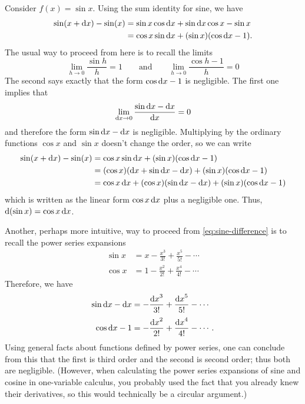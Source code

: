 \documentclass[12pt]{amsart}
\begin{document}
\begin{eg}
  Consider $f(x) = \sin x$.
  Using the sum identity for sine, we have
  \begin{align}
    \sin(x+{\mathrm{d} x}) - \sin (x)
    &= \sin x \cos {\ensuremath{\mathrm{d} x}} + \sin {\ensuremath{\mathrm{d} x}} \cos x - \sin x \notag\\
    &= \cos x \sin {\ensuremath{\mathrm{d} x}} + (\sin x) (\cos {\ensuremath{\mathrm{d} x}} - 1).\label{eq:sine-difference}
  \end{align}
  The usual way to proceed from here is to recall the limits
  \[ \lim_{h\to 0} \frac{\sin h}{h} = 1 \qquad\text{and}\qquad
  \lim_{h\to 0} \frac{\cos h - 1}{h} = 0 \]
  The second says exactly that the form $\cos {\ensuremath{\mathrm{d} x}} - 1$ is negligible.
  The first one implies that
  \[ \lim_{{\mathrm{d} x}\to 0} \frac{\sin {\ensuremath{\mathrm{d} x}} - {\mathrm{d} x}}{{\mathrm{d} x}} = 0 \]
  and therefore the form $\sin {\ensuremath{\mathrm{d} x}} - {\mathrm{d} x}$ is negligible.
  Multiplying by the ordinary functions $\cos x$ and $\sin x$ doesn't change the order, so we can write
  \begin{align*}
    \sin(x+{\mathrm{d} x}) - \sin (x)
    &= \cos x \sin {\ensuremath{\mathrm{d} x}} + (\sin x) (\cos {\ensuremath{\mathrm{d} x}} - 1)\\
    &= (\cos x )({\mathrm{d} x}  + \sin {\ensuremath{\mathrm{d} x}} - {\mathrm{d} x}) + (\sin x) (\cos {\ensuremath{\mathrm{d} x}} - 1)\\
    &= \cos x \,{\mathrm{d} x} + (\cos x) (\sin {\ensuremath{\mathrm{d} x}} - {\mathrm{d} x}) + (\sin x) (\cos {\ensuremath{\mathrm{d} x}} - 1)
  \end{align*}
  which is written as the linear form $\cos x \,{\mathrm{d} x}$ plus a negligible one.
  Thus, $\mathrm{d}(\sin x) = \cos x \,{\mathrm{d} x}$.

  Another, perhaps more intuitive, way to proceed from \cref{eq:sine-difference} is to recall the power series expansions
  \begin{align*}
    \sin x &= x - \frac{x^3}{3!} + \frac{x^5}{5!} - \cdots\\[2pt]
    \cos x &= 1 - \frac{x^2}{2!} + \frac{x^4}{4!} - \cdots
  \end{align*}
  Therefore, we have
  \begin{align*}
    \sin {\ensuremath{\mathrm{d} x}} - {\mathrm{d} x} &= - \frac{{\mathrm{d} x}^3}{3!} + \frac{{\mathrm{d} x}^5}{5!} - \cdots\\[2pt]
    \cos {\ensuremath{\mathrm{d} x}} - 1 &= - \frac{{\mathrm{d} x}^2}{2!} + \frac{{\mathrm{d} x}^4}{4!} - \cdots.
  \end{align*}
  Using general facts about functions defined by power series, one can conclude from this that the first is third order and the second is second order; thus both are negligible.
  (However, when calculating the power series expansions of sine and cosine in one-variable calculus, you probably used the fact that you already knew their derivatives, so this would technically be a circular argument.)
\end{eg}
\end{document}
